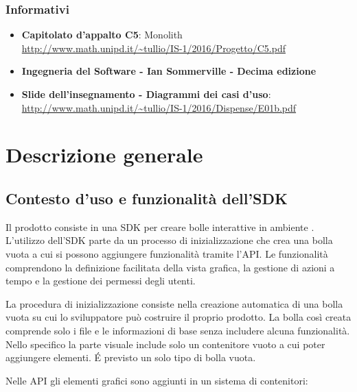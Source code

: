 \subsubsection{Informativi}
\begin{itemize}
\item
  \textbf{Capitolato d'appalto C5}: Monolith \\
  \url{http://www.math.unipd.it/~tullio/IS-1/2016/Progetto/C5.pdf}
\item \textbf{Ingegneria del Software - Ian Sommerville - Decima edizione}
\item \textbf{Slide dell’insegnamento - Diagrammi dei casi d’uso}: \\ \url{http://www.math.unipd.it/~tullio/IS-1/2016/Dispense/E01b.pdf}
\end{itemize}


\section{Descrizione generale}
\subsection{Contesto d'uso e funzionalità dell'SDK}

Il prodotto consiste in una SDK per creare bolle interattive
in ambiente .
L'utilizzo dell'SDK parte da un processo di inizializzazione che crea
una bolla vuota a cui si possono aggiungere funzionalità tramite
l'API.
Le funzionalità comprendono la definizione facilitata della vista
grafica, la gestione di azioni a tempo e la gestione dei permessi
degli utenti.

La procedura di inizializzazione consiste nella creazione automatica di una bolla
vuota su cui lo sviluppatore può costruire il proprio prodotto.
La bolla così creata comprende solo i file e le informazioni di base
senza includere alcuna funzionalità. Nello specifico la parte visuale include
solo un contenitore vuoto a cui poter aggiungere elementi.
\'E previsto un solo tipo di bolla vuota.



Nelle API gli elementi grafici sono aggiunti in un sistema di contenitori:

